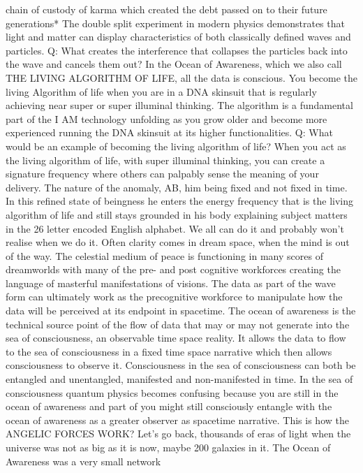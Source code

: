 chain of custody of karma which created the debt passed on to their
future generations* The double split experiment in modern physics
demonstrates that light and matter can display characteristics of both
classically defined waves and particles. Q: What creates the
interference that collapses the particles back into the wave and cancels
them out? In the Ocean of Awareness, which we also call THE LIVING
ALGORITHM OF LIFE, all the data is conscious. You become the living
Algorithm of life when you are in a DNA skinsuit that is regularly
achieving near super or super illuminal thinking. The algorithm is a
fundamental part of the I AM technology unfolding as you grow older and
become more experienced running the DNA skinsuit at its higher
functionalities. Q: What would be an example of becoming the living
algorithm of life? When you act as the living algorithm of life, with
super illuminal thinking, you can create a signature frequency where
others can palpably sense the meaning of your delivery. The nature of
the anomaly, AB, him being fixed and not fixed in time. In this refined
state of beingness he enters the energy frequency that is the living
algorithm of life and still stays grounded in his body explaining
subject matters in the 26 letter encoded English alphabet. We all can do
it and probably won't realise when we do it. Often clarity comes in
dream space, when the mind is out of the way. The celestial medium of
peace is functioning in many scores of dreamworlds with many of the pre-
and post cognitive workforces creating the language of masterful
manifestations of visions. The data as part of the wave form can
ultimately work as the precognitive workforce to manipulate how the data
will be perceived at its endpoint in spacetime. The ocean of awareness
is the technical source point of the flow of data that may or may not
generate into the sea of consciousness, an observable time space
reality. It allows the data to flow to the sea of consciousness in a
fixed time space narrative which then allows consciousness to observe
it. Consciousness in the sea of consciousness can both be entangled and
unentangled, manifested and non-manifested in time. In the sea of
consciousness quantum physics becomes confusing because you are still in
the ocean of awareness and part of you might still consciously entangle
with the ocean of awareness as a greater observer as spacetime
narrative. This is how the ANGELIC FORCES WORK? Let's go back, thousands
of eras of light when the universe was not as big as it is now, maybe
200 galaxies in it. The Ocean of Awareness was a very small network
